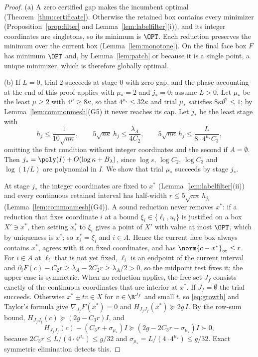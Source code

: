 \begin{proof}
(a) A zero certified gap makes the incumbent optimal
(Theorem~\ref{thm:certificate}). Otherwise the retained box contains every
minimizer (Proposition~\ref{prop:filter} and Lemma~\ref{lem:labelfilter}(i)),
and its integer coordinates are singletons, so its minimum is $\OPT$. Each
reduction preserves the minimum over the current box
(Lemma~\ref{lem:monotone}). On the final face box $F$ has minimum $\OPT$ and,
by Lemma~\ref{lem:patch} or because it is a single point, a unique minimizer,
which is therefore globally optimal.

(b) If $L=0$, trial $2$ succeeds at stage $0$ with zero gap, and the phase
accounting at the end of this proof applies with $\mu_*=2$ and $j_*=0$;
assume $L>0$.
Let $\mu_*$ be the least $\mu\ge2$ with $4^\mu\ge8\kappa$, so that
$4^{\mu_*}\le32\kappa$ and trial $\mu_*$ satisfies $8\kappa\theta^2\le1$; by
Lemma~\ref{lem:commonmesh}(G5) it never reaches its cap. Let $j_*$ be the least
stage with
\[
h_j\le\frac1{10\sqrt{n\kappa}},\qquad
5\sqrt{n\kappa}\,h_j\le\frac{\lambda_A}{4C_2},\qquad
5\sqrt{n\kappa}\,h_j\le\frac L{8\cdot4^{\mu_*}C_3},
\]
omitting the first condition without integer coordinates and the second if
$A=\emptyset$. Then $j_*=\poly(I)+O(\log\kappa+B_\lambda)$, since
$\log s$, $\log C_2$, $\log C_3$ and $\log(1/L)$ are polynomial in $I$. We
show that trial $\mu_*$ succeeds by stage $j_*$.

At stage $j_*$ the integer coordinates are fixed to $x^*$
(Lemma~\ref{lem:labelfilter}(ii)) and every continuous retained interval has
half-width $r\le5\sqrt{n\kappa}\,h_{j_*}$ (Lemma~\ref{lem:commonmesh}(G4)). A
sound reduction never removes $x^*$: if a reduction that fixes coordinate $i$
at a bound $\xi_i\in\{\ell_i,u_i\}$ is justified on a box $X'\ni x^*$, then
setting $x^*_i$ to $\xi_i$ gives a point of $X'$ with value at most $\OPT$,
which by uniqueness is $x^*$; so $x^*_i=\xi_i$ and $i\in A$. Hence the
current face box always contains $x^*$, agrees with it on fixed coordinates,
and has
$\norm{c-x^*}_\infty\le r$. For $i\in A$ at $\ell_i$ that is not yet
fixed, $\ell_i$ is an endpoint of the current interval and
$\partial_iF(c)-C_2r\ge\lambda_A-2C_2r\ge\lambda_A/2>0$, so the midpoint test
fixes it; the upper case is symmetric. When no reduction applies, the free
set $J_f$ consists exactly of the continuous coordinates that are interior at
$x^*$. If $J_f=\emptyset$ the trial succeeds. Otherwise $x^*\pm tv\in X$ for
$v\in\R^{J_f}$ and small $t$, so \eqref{eq:growth} and Taylor's formula give
$\nabla_{J_f}F(x^*)=0$ and $H_{J_fJ_f}(x^*)\succeq2g\,I$. By the row-sum bound,
$H_{J_fJ_f}(c)\succeq(2g-C_3r)I$, and
\[
H_{J_fJ_f}(c)-(C_3r+\sigma_{\mu_*})I\succeq(2g-2C_3r-\sigma_{\mu_*})I
\succ0,
\]
because $2C_3r\le L/(4\cdot4^{\mu_*})\le g/32$ and
$\sigma_{\mu_*}=L/(4\cdot4^{\mu_*})\le g/32$. Exact symmetric elimination
detects this.


\end{proof}
